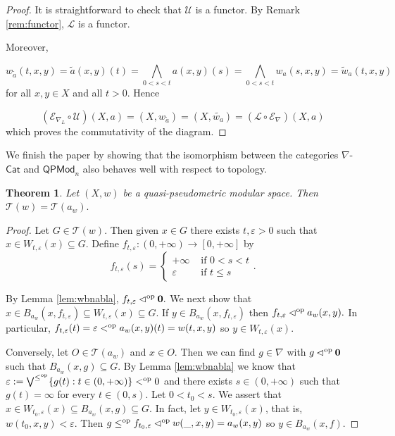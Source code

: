 \documentclass[11pt,a4paper]{amsart}
\newtheorem{theorem}{Theorem}[section]
\theoremstyle{definition}
\begin{document}
	\begin{proof}
		It is straightforward to check that $\mathscr{U}$ is a functor. By Remark \ref{rem:functor}, $\mathscr{L}$ is a functor. 
		
		Moreover, 
		
		$$w_{\widetilde{a}}(t,x,y)=\widetilde{a}(x,y)(t)=\bigwedge_{0<s<t} a(x,y)(s)=\bigwedge_{0<s<t}w_a(s,x,y)=\widetilde{w}_a(t,x,y)$$
		for all $x,y\in X$ and all $t>0.$ Hence
		
		$$(\mathscr{E}_{\nabla_L}\circ\mathscr{U})(X,a)=(X,w_{\widetilde{a}})=(X,\widetilde{w_a})=(\mathscr{L}\circ\mathscr{E}_\nabla)(X,a)$$
		which proves the commutativity of the diagram.
	\end{proof}
	
	We finish the paper by showing that the isomorphism between the categories  $\nabla$-$\mathsf{Cat}$ and $\mathsf{QPMod}_n$ also behaves well with respect to topology.
	
	\begin{theorem}\label{thm:topology}
		Let $(X,w)$ be a quasi-pseudometric modular space. Then $\mathcal{T}(w
		)=\mathcal{T}(a_w).$
	\end{theorem}
	
	\begin{proof}
		Let $G\in\mathcal{T}(w).$ Then given $x\in G$ there exists $t,\varepsilon>0$ such that $x\in W_{t,\varepsilon}(x)\subseteq G.$
		Define $f_{t,\varepsilon}:(0,+\infty)\to [0,+\infty]$ by
		$$f_{t,\varepsilon}(s)=\begin{cases} +\infty&\text{ if }0<s<t\\
			\varepsilon&\text{ if }t\leq s
		\end{cases}.
		$$
		
		By Lemma \ref{lem:wbnabla}, $f_{t,\varepsilon}\lhd^\text{\normalfont op}\mathbf{0}.$ We next show that $x\in B_{a_w}(x,f_{t,\varepsilon})\subseteq W_{t,\varepsilon}(x)\subseteq G.$ If $y\in B_{a_w}(x,f_{t,\varepsilon})$ then $f_{t,\varepsilon}\lhd^\text{\normalfont op}a_w(x,y).$ In particular, $f_{t,\varepsilon}(t)=\varepsilon<^\text{\normalfont op}a_w(x,y)(t)=w(t,x,y)$ so $y\in W_{t,\varepsilon}(x).$
		
		
		Conversely, let $O\in\mathcal{T}(a_w)$ and $x\in O.$ Then we can find $g\in\nabla$ with $g\lhd^\text{\normalfont op}\mathbf{0}$ such that $B_{a_w}(x,g)\subseteq G.$ By Lemma \ref{lem:wbnabla} we know that $\varepsilon:=\bigvee^{\leq^\text{\normalfont op}}\{g(t):t\in (0,+\infty)\}<^\text{\normalfont op} 0$ and there exists $s\in (0,+\infty)$ such that $g(t)=\infty$ for every $t\in (0,s).$ Let $0<t_0<s$. We assert that $x\in W_{t_0,\varepsilon}(x)\subseteq B_{a_w}(x,g)\subseteq G.$ In fact, let $y\in W_{t_0,\varepsilon}(x)$, that is, $w(t_0,x,y)<\varepsilon.$ Then $g\leq^\text{\normalfont op} f_{t_0,\varepsilon}\lhd^\text{\normalfont op}w(\_,x,y)=a_w(x,y)$ so $y\in B_{a_w}(x,f).$
	\end{proof}
	
\end{document}
